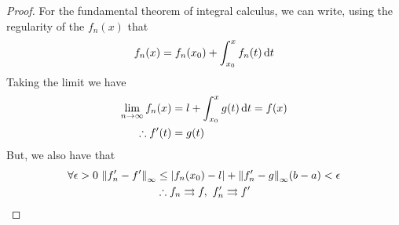\documentclass[../complete.tex]{subfiles}
\begin{document}
\begin{proof}
	For the fundamental theorem of integral calculus, we can write, using the regularity of the $f_n(x)$ that
	\begin{equation*}
		f_n(x)=f_n(x_0)+\int_{x_0}^{x}f_n(t)\operatorname{d\!} t
	\end{equation*}
	Taking the limit we have
	\begin{equation*}
		\begin{aligned}
			\lim_{n\to\infty}f_n(x)&=l+\int_{x_0}^{x}g(t)\operatorname{d\!} t=f(x)\\
			\therefore f'(t)&=g(t)
		\end{aligned}
	\end{equation*}
	But, we also have that
	\begin{equation*}
		\begin{aligned}
			\forall\epsilon>0\ \norm{f_n'-f'}_\infty&\le\abs{f_n(x_0)-l}+\norm{f_n'-g}_\infty(b-a)<\epsilon\\
			&\therefore f_n\tto f,\ f_n'\tto f'
		\end{aligned}
	\end{equation*}
\end{proof}
\end{document}
